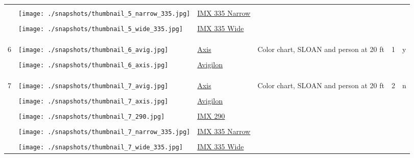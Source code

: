 \documentclass{article}%
\begin{document}
\begin{longtabu}{m{2.5cm} m{4cm} m{2cm} m{4cm} m{2cm} m{2cm}}
&&&&&\\%
&\texttt{[image: ./snapshots/thumbnail\_5\_narrow\_335.jpg]}&\href{https://drive.google.com/file/d/1MQ62ueWGeNSn5hTgv0Cb9bHy7E15cG4s/view?usp=sharing}{IMX 335 Narrow}&&&\\%
&&&&&\\%
&\texttt{[image: ./snapshots/thumbnail\_5\_wide\_335.jpg]}&\href{https://drive.google.com/file/d/1J57Q7X3TEIUolCkM8lYnVRJPfiJJ7LMx/view?usp=sharing}{IMX 335 Wide}&&&\\%
&&&&&\\%
&&&&&\\%
\hline%
&&&&&\\%
6&\texttt{[image: ./snapshots/thumbnail\_6\_avig.jpg]}&\href{https://drive.google.com/file/d/1-unNIZgpA4LrxhFTv3yI0XTs4Ums2sXT/view?usp=sharing}{Axis}&Color chart, SLOAN and person at 20 ft&1&y\\%
&&&&&\\%
&\texttt{[image: ./snapshots/thumbnail\_6\_axis.jpg]}&\href{https://drive.google.com/file/d/18wdWWZ1hZeuV-ki4ZMS3tXETaytrt_8T/view?usp=sharing}{Avigilon}&&&\\%
&&&&&\\%
&&&&&\\%
\hline%
&&&&&\\%
7&\texttt{[image: ./snapshots/thumbnail\_7\_avig.jpg]}&\href{https://drive.google.com/file/d/1qptludf_UZIqGHxItrbNUXgCzhPPumvX/view?usp=sharing}{Axis}&Color chart, SLOAN and person at 20 ft&2&n\\%
&&&&&\\%
&\texttt{[image: ./snapshots/thumbnail\_7\_axis.jpg]}&\href{https://drive.google.com/file/d/1f8RQPy_FFPnRBtsRk0pm2fEskeGoM7Ch/view?usp=sharing}{Avigilon}&&&\\%
&&&&&\\%
&\texttt{[image: ./snapshots/thumbnail\_7\_290.jpg]}&\href{https://drive.google.com/file/d/1kxk21TfAbRHpIF3kIF0k_iZfc-TPDjNU/view?usp=sharing}{IMX 290}&&&\\%
&&&&&\\%
&\texttt{[image: ./snapshots/thumbnail\_7\_narrow\_335.jpg]}&\href{https://drive.google.com/file/d/1OTPJ0HS0eiPVacBwNbepHquzjVpoiMlu/view?usp=sharing}{IMX 335 Narrow}&&&\\%
&&&&&\\%
&\texttt{[image: ./snapshots/thumbnail\_7\_wide\_335.jpg]}&\href{https://drive.google.com/file/d/11lUd81R7js5HzBBaUpF55w-e0aK8BDvh/view?usp=sharing}{IMX 335 Wide}&&&\\%

\end{longtabu}
\end{document}
